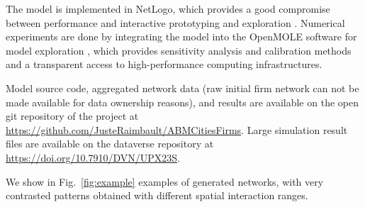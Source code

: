 \documentclass[11pt]{article}
\begin{document}
The model is implemented in NetLogo, which provides a good compromise between performance and interactive prototyping and exploration \cite{railsback2017improving}. Numerical experiments are done by integrating the model into the OpenMOLE software for model exploration \cite{reuillon2013openmole}, which provides sensitivity analysis and calibration methods and a transparent access to high-performance computing infrastructures.

Model source code, aggregated network data (raw initial firm network can not be made available for data ownership reasons), and results are available on the open git repository of the project at \url{https://github.com/JusteRaimbault/ABMCitiesFirms}. Large simulation result files are available on the dataverse repository at \url{https://doi.org/10.7910/DVN/UPX23S}.

We show in Fig.~\ref{fig:example} examples of generated networks, with very contrasted patterns obtained with different spatial interaction ranges.
\end{document}
